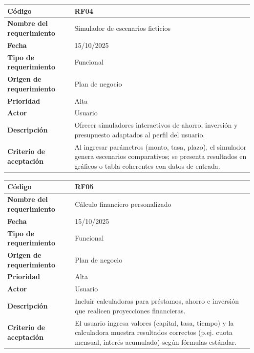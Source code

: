 \begin{table}[H]
	\begin{tabular}{|a{5cm}|m{11cm}|}
		\hline
		\textbf{Código} & RF04 \\ \hline
		\textbf{Nombre del requerimiento} & Simulador de escenarios ficticios \\ \hline
		\textbf{Fecha} & 15/10/2025 \\ \hline
		\textbf{Tipo de requerimiento} & Funcional \\ \hline
		\textbf{Origen de requerimiento} & Plan de negocio \\ \hline
		\textbf{Prioridad} & Alta \\ \hline
		\textbf{Actor} & Usuario \\ \hline
		\textbf{Descripción} & Ofrecer simuladores interactivos de ahorro, inversión y presupuesto adaptados al perfil del usuario. \\ \hline
		\textbf{Criterio de aceptación} & Al ingresar parámetros (monto, tasa, plazo), el simulador genera escenarios comparativos; se presenta resultados en gráficos o tabla coherentes con datos de entrada. \\ \hline
	\end{tabular}
\end{table}

\begin{table}[H]
	\begin{tabular}{|a{5cm}|m{11cm}|}
		\hline
		\textbf{Código} & RF05 \\ \hline
		\textbf{Nombre del requerimiento} & Cálculo financiero personalizado \\ \hline
		\textbf{Fecha} & 15/10/2025 \\ \hline
		\textbf{Tipo de requerimiento} & Funcional \\ \hline
		\textbf{Origen de requerimiento} & Plan de negocio \\ \hline
		\textbf{Prioridad} & Alta \\ \hline
		\textbf{Actor} & Usuario \\ \hline
		\textbf{Descripción} & Incluir calculadoras para préstamos, ahorro e inversión que realicen proyecciones financieras. \\ \hline
		\textbf{Criterio de aceptación} & El usuario ingresa valores (capital, tasa, tiempo) y la calculadora muestra resultados correctos (p.ej. cuota mensual, interés acumulado) según fórmulas estándar. \\ \hline
	\end{tabular}
\end{table}

